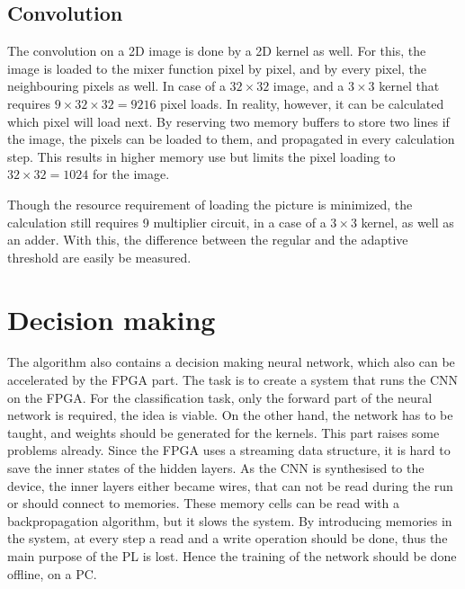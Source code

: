 \subsection{Convolution} %
The convolution on a 2D image is done by a 2D kernel as well.
For this, the image is loaded to the mixer function pixel by pixel, and by every pixel, the neighbouring pixels as well.
In case of a $32\times32$ image, and a $3\times3$ kernel that requires $9\times32\times32 = 9216$ pixel loads.
In reality, however, it can be calculated which pixel will load next.
By reserving two memory buffers to store two lines if the image, the pixels can be loaded to them, and propagated in every calculation step.
This results in higher memory use but limits the pixel loading to $32\times32 = 1024$ for the image.

Though the resource requirement of loading the picture is minimized, the calculation still requires 9 multiplier circuit, in a case of a $3\times3$ kernel, as well as an adder.
With this, the difference between the regular and the adaptive threshold are easily be measured.

\section{Decision making} %
The algorithm also contains a decision making neural network, which also can be accelerated by the FPGA part.
The task is to create a system that runs the CNN on the FPGA.
For the classification task, only the forward part of the neural network is required, the idea is viable.
On the other hand, the network has to be taught, and weights should be generated for the kernels.
This part raises some problems already.
Since the FPGA uses a streaming data structure, it is hard to save the inner states of the hidden layers.
As the CNN is synthesised to the device, the inner layers either became wires, that can not be read during the run or should connect to memories.
These memory cells can be read with a backpropagation algorithm, but it slows the system.
By introducing memories in the system, at every step a read and a write operation should be done, thus the main purpose of the PL is lost.
Hence the training of the network should be done offline, on a PC.

